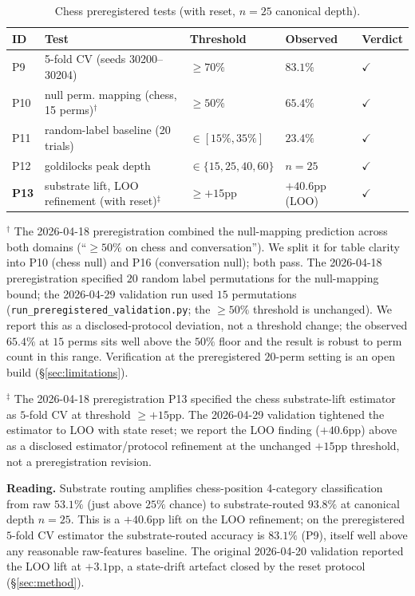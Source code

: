 \begin{table}[ht]
\centering
\small
\caption{Chess preregistered tests (with reset, $n=25$ canonical
depth).}
\label{tab:chess_prereg}
\begin{tabular}{l l l l l}
\toprule
ID & Test & Threshold & Observed & Verdict \\
\midrule
P9  & 5-fold CV (seeds 30200--30204)        & $\geq 70\%$ & $83.1\%$ & $\checkmark$ \\
P10 & null perm. mapping (chess, 15 perms)$^{\dagger}$  & $\geq 50\%$ & $65.4\%$ & $\checkmark$ \\
P11 & random-label baseline (20 trials)     & $\in[15\%, 35\%]$ & $23.4\%$ & $\checkmark$ \\
P12 & goldilocks peak depth                 & $\in\{15,25,40,60\}$ & $n=25$ & $\checkmark$ \\
\textbf{P13} & substrate lift, LOO refinement (with reset)$^{\ddagger}$ & $\geq +15$pp & $\mathbf{+40.6}$pp (LOO) & $\checkmark$ \\
\bottomrule
\end{tabular}
\end{table}

$^{\dagger}$ The 2026-04-18 preregistration combined the null-mapping
prediction across both domains (``$\geq 50\%$ on chess and
conversation''). We split it for table clarity into P10 (chess null)
and P16 (conversation null); both pass. The 2026-04-18 preregistration
specified $20$ random label permutations for the null-mapping bound;
the 2026-04-29 validation run used $15$ permutations
(\texttt{run\_preregistered\_validation.py}; the $\geq 50\%$ threshold
is unchanged). We report this as a disclosed-protocol deviation, not
a threshold change; the observed $65.4\%$ at $15$ perms sits well
above the $50\%$ floor and the result is robust to perm count in this
range. Verification at the preregistered $20$-perm setting is an open
build (\S\ref{sec:limitations}).

$^{\ddagger}$ The 2026-04-18 preregistration P13 specified the chess
substrate-lift estimator as $5$-fold CV at threshold $\geq +15$pp.
The 2026-04-29 validation tightened the estimator to LOO with state
reset; we report the LOO finding ($+40.6$pp) above as a disclosed
estimator/protocol refinement at the unchanged $+15$pp threshold,
not a preregistration revision.

\textbf{Reading.} Substrate routing amplifies chess-position
4-category classification from raw $53.1\%$ (just above $25\%$
chance) to substrate-routed $93.8\%$ at canonical depth $n=25$.
This is a $+40.6$pp lift on the LOO refinement; on the preregistered
$5$-fold CV estimator the substrate-routed accuracy is $83.1\%$
(P9), itself well above any reasonable raw-features baseline.
The original 2026-04-20 validation reported the LOO lift at
$+3.1$pp, a state-drift artefact closed by the reset protocol
(\S\ref{sec:method}).


